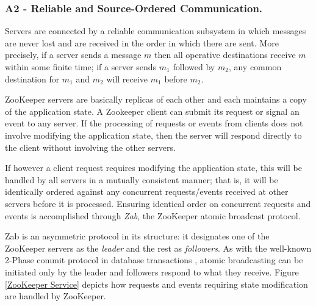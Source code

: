 \documentclass[a4paper,UKenglish]{oasics-v2016}
\begin{document}
\subsubsection*{A2 - Reliable and Source-Ordered Communication.} \label{A2}
Servers are connected by a reliable communication subsystem in which messages are never lost and are received in the order in which there are sent. More precisely, if a server sends a message $m$ then all operative destinations receive $m$ within some finite time; if a server sends $m_1$ followed by $m_2$, any common destination for $m_1$ and $m_2$ will receive
$m_1$ before $m_2$.

ZooKeeper servers are basically replicas of each other and each maintains a copy of the application state. A Zookeeper client can submit its request or signal an event to any server. If the processing of requests or events from clients does not involve modifying the application state, then the server will respond directly to the client without involving the other servers. 

If however a client request requires modifying the application state, this will be handled by all servers in a mutually consistent manner; that is, it will be identically ordered against any concurrent requests/events received at other servers  before it is processed. Ensuring identical order on concurrent requests and events is accomplished through \emph{Zab}, the ZooKeeper atomic broadcast protocol.

Zab is an asymmetric protocol in its structure: it designates one of the ZooKeeper servers as the \emph{leader} and the rest as \emph{followers}. As with the well-known 2-Phase commit protocol in database transactions \cite{bernstein2009principles}, atomic broadcasting can be initiated only by the leader and followers respond to what they receive. Figure \ref{ZooKeeper Service} depicts how requests and events requiring state modification are handled by ZooKeeper.
\end{document}
